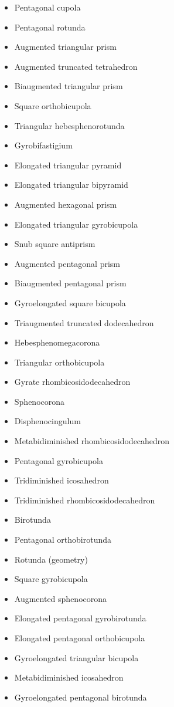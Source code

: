 \begin{itemize}
\item Pentagonal cupola 
\item Pentagonal rotunda 
\item Augmented triangular prism 
\item Augmented truncated tetrahedron 
\item Biaugmented triangular prism 
\item Square orthobicupola 
\item Triangular hebesphenorotunda 
\item Gyrobifastigium 
\item Elongated triangular pyramid 
\item Elongated triangular bipyramid 
\item Augmented hexagonal prism 
\item Elongated triangular gyrobicupola 
\item Snub square antiprism 
\item Augmented pentagonal prism 
\item Biaugmented pentagonal prism 
\item Gyroelongated square bicupola 
\item Triaugmented truncated dodecahedron 
\item Hebesphenomegacorona 
\item Triangular orthobicupola 
\item Gyrate rhombicosidodecahedron 
\item Sphenocorona 
\item Disphenocingulum 
\item Metabidiminished rhombicosidodecahedron 
\item Pentagonal gyrobicupola 
\item Tridiminished icosahedron 
\item Tridiminished rhombicosidodecahedron 
\item Birotunda 
\item Pentagonal orthobirotunda 
\item Rotunda (geometry) 
\item Square gyrobicupola 
\item Augmented sphenocorona 
\item Elongated pentagonal gyrobirotunda 
\item Elongated pentagonal orthobicupola 
\item Gyroelongated triangular bicupola 
\item Metabidiminished icosahedron 
\item Gyroelongated pentagonal birotunda 

\end{itemize}
